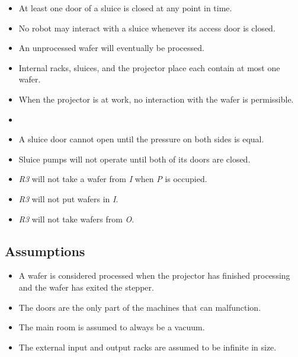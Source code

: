
\begin{itemize}
  \item At least one door of a sluice is closed at any point in time.
  \item No robot may interact with a sluice whenever its access door is closed.
  \item An unprocessed wafer will eventually be processed.
  \item Internal racks, sluices, and the projector place each contain at most one wafer.
  \item When the projector is at work, no interaction with the wafer is permissible.
  \item {}
  \item A sluice door cannot open until the pressure on both sides is equal.
  \item Sluice pumps will not operate until both of its doors are closed.
  \item \emph{R3} will not take a wafer from \emph{I} when \emph{P} is occupied.
  \item \emph{R3} will not put wafers in \emph{I}.
  \item \emph{R3} will not take wafers from \emph{O}.
\end{itemize}

\subsection{Assumptions}
\begin{itemize}
  \item A wafer is considered processed when the projector has finished processing and the wafer has exited the stepper.
  \item The doors are the only part of the machines that can malfunction.
  \item The main room is assumed to always be a vacuum.
  \item The external input and output racks are assumed to be infinite in size.
\end{itemize}